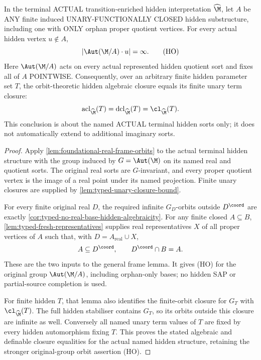 \begin{lemma}
\label{lem:typed-hereditary-hidden-orbits}
In the terminal ACTUAL transition-enriched hidden
interpretation $\widehat{\M}$, let $A$ be ANY
finite induced UNARY-FUNCTIONALLY CLOSED
hidden substructure, including one with ONLY
orphan proper quotient vertices.
For every actual hidden vertex $u\notin A$,
\[
       |\Aut(\M/A)\cdot u|=\infty.
 \tag{HO}\label{eq:typed-hereditary-hidden-orbits}
\]
Here $\Aut(\M/A)$ acts on every actual represented
hidden quotient sort and fixes all of $A$ POINTWISE.
Consequently, over an arbitrary finite hidden
parameter set $T$, the orbit-theoretic hidden
algebraic closure equals its finite unary term
closure:
\[
    \operatorname{acl}_{\widehat{\M}}(T)
      =\operatorname{dcl}_{\widehat{\M}}(T)
      =\cl_{\widehat{\M}}(T).
\]
This conclusion is about the named ACTUAL
terminal hidden sorts only; it does not
automatically extend to additional imaginary sorts.
\end{lemma}
\begin{proof}
Apply \cref{lem:foundational-real-frame-orbits} to the actual terminal
hidden structure with the group induced by $G=\Aut(\M)$ on its named
real and quotient sorts. The original real sorts are $G$-invariant,
and every proper quotient vertex is the image of a real point under
its named projection. Finite unary closures are supplied by
\cref{lem:typed-unary-closure-bound}.

For every finite original real $D$, the required infinite $G_D$-orbits
outside $D^{\coord}$ are exactly
\cref{cor:typed-no-real-base-hidden-algebraicity}. For any finite
closed $A\subseteq B$, \cref{lem:typed-fresh-representatives} supplies
real representatives $X$ of all proper vertices of $A$ such that,
with $D=A_{\mathrm{real}}\cup X$,
\[
                    A\subseteq D^{\coord},\qquad
                    D^{\coord}\cap B=A.
\]
These are the two inputs to the general frame lemma. It gives (HO)
for the original group $\Aut(\M/A)$, including orphan-only bases;
no hidden SAP or partial-source completion is used.

For finite hidden $T$, that lemma also identifies the finite-orbit
closure for $G_T$ with $\cl_{\widehat{\M}}(T)$. The full hidden
stabiliser contains $G_T$, so its orbits outside this closure are
infinite as well. Conversely all named unary term values of $T$
are fixed by every hidden automorphism fixing $T$. This proves the
stated algebraic and definable closure equalities for the actual
named hidden structure, retaining the stronger original-group
orbit assertion (HO).
\end{proof}

